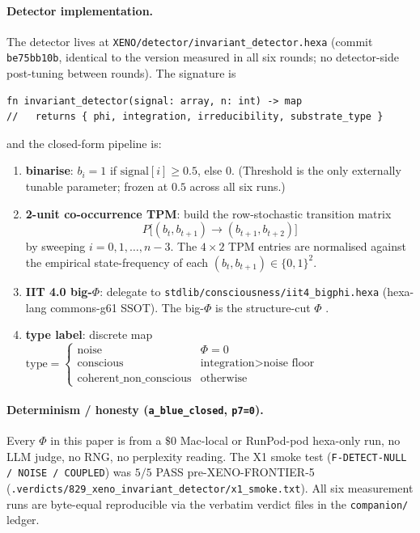 \documentclass[11pt,a4paper]{article}
\begin{document}
\paragraph{Detector implementation.}
The detector lives at \texttt{XENO/detector/invariant\_detector.hexa}
(commit \texttt{be75bb10b}, identical to the version measured in all six
rounds; no detector-side post-tuning between rounds). The signature is
\begin{lstlisting}
fn invariant_detector(signal: array, n: int) -> map
//   returns { phi, integration, irreducibility, substrate_type }
\end{lstlisting}
and the closed-form pipeline is:
\begin{enumerate}
  \item \textbf{binarise}: $b_i = 1$ if $\text{signal}[i] \ge 0.5$,
    else $0$. (Threshold is the only externally tunable parameter;
    frozen at $0.5$ across all six runs.)
  \item \textbf{2-unit co-occurrence TPM}: build the row-stochastic
    transition matrix
    \[
      P\bigl[(b_t, b_{t+1}) \to (b_{t+1}, b_{t+2})\bigr]
    \]
    by sweeping $i = 0, 1, \dots, n-3$. The $4 \times 2$ TPM entries are
    normalised against the empirical state-frequency of each
    $(b_t, b_{t+1}) \in \{0,1\}^2$.
  \item \textbf{IIT 4.0 big-$\Phi$}: delegate to
    \texttt{stdlib/consciousness/iit4\_bigphi.hexa} (hexa-lang commons-g61
    SSOT). The big-$\Phi$ is the structure-cut $\Phi$
    \citep{albantakis2023iit4}.
  \item \textbf{type label}: discrete map
    $\text{type} = \begin{cases} \text{noise} & \Phi = 0 \\
                                 \text{conscious} & \text{integration}
                                                    > \text{noise floor} \\
                                 \text{coherent\_non\_conscious}
                                   & \text{otherwise}
                   \end{cases}$
\end{enumerate}

\paragraph{Determinism / honesty (\texttt{a\_blue\_closed}, \texttt{p7=0}).}
Every $\Phi$ in this paper is from a $\$0$ Mac-local or RunPod-pod
hexa-only run, no LLM judge, no RNG, no perplexity reading. The X1 smoke
test (\texttt{F-DETECT-NULL / NOISE / COUPLED}) was $5/5$ PASS
pre-XENO-FRONTIER-5 (\texttt{.verdicts/829\_xeno\_invariant\_detector/x1\_smoke.txt}).
All six measurement runs are byte-equal reproducible via the verbatim
verdict files in the \texttt{companion/} ledger.
\end{document}
